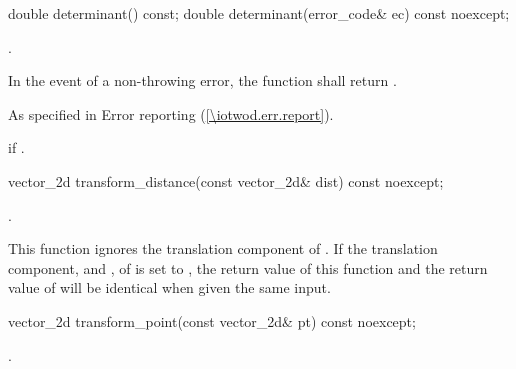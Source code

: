 \begin{itemdecl}
double determinant() const;
double determinant(error_code& ec) const noexcept;
\end{itemdecl}
\begin{itemdescr}
	\pnum
	\returns
	.
	
	\pnum
	In the event of a non-throwing error, the function shall return .

	\pnum
	\throws
	As specified in Error reporting (\ref{\iotwod.err.report}).

	\pnum
	\errors
	 if .
\end{itemdescr}

\begin{itemdecl}
vector_2d transform_distance(const vector_2d& dist) const noexcept;
\end{itemdecl}
\begin{itemdescr}
	\pnum
	\returns
	.
	
	\pnum
	\realnote
	This function ignores the translation component of . If the 
	translation component,  and , of  is set to , the return value of this function and the return 
	value of  will be identical when given the 
	same input.
\end{itemdescr}

\begin{itemdecl}
vector_2d transform_point(const vector_2d& pt) const noexcept;
\end{itemdecl}
\begin{itemdescr}
	\pnum
	\returns
	.
\end{itemdescr}

